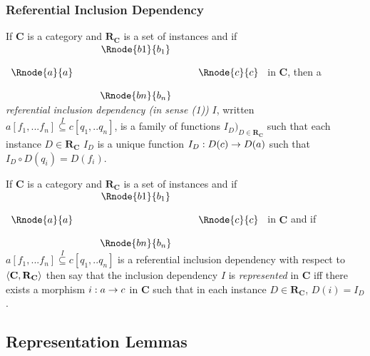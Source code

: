 \documentclass[10pt,a4paper]{article}
\theoremstyle{remark}
\newcommand{\catc}[1][C]{\textbf{#1}}
\newcommand{\reqt}{\textbf{R}}
\newcommand{\reqtc}[1][\catc]{\reqt_{#1}}
\newcommand{\term}[1]{\textit{#1}}  %
\begin{document}
\subsubsection{Referential Inclusion Dependency}
\begin{definition}
If $\catc$ is a category and $\reqtc$ is a set of instances and if
$
\begin{array}{c p{0.25cm} c  p{0.25cm} c }
             &&   \Rnode{b1}{b_1} &&              \\[0.4cm]
\Rnode{a}{a} &&                   && \Rnode{c}{c} \\[0.4cm]
             &&   \Rnode{bn}{b_n} &&              
\end{array} 
$
in $\catc$, then a \term{referential inclusion dependency (in sense (1))} $I$, written $a[f_1,...f_n] \overset{I}{\subseteq} c[q_1,..q_n]$, is a family of functions $I_D)_{D \in \reqtc}$
such that each instance $D \in \reqtc$ $I_D$ is a unique function $I_D : D(c) \rightarrow D(a)$ such that
$I_D \circ D(q_i) = D(f_i)$.
\end{definition}

\begin{definition}
If $\catc$ is a category and $\reqtc$ is a set of instances and if
$
\begin{array}{c p{0.25cm} c  p{0.25cm} c }
             &&   \Rnode{b1}{b_1} &&              \\[0.4cm]
\Rnode{a}{a} &&                   && \Rnode{c}{c} \\[0.4cm]
             &&   \Rnode{bn}{b_n} &&              
\end{array} 
$
in $\catc$ and if $a[f_1,...f_n] \overset{I}{\subseteq} c[q_1,..q_n]$ is a referential inclusion dependency
with respect  to $\tuple{\catc,\reqtc}$ then say that the inclusion dependency $I$ is \term{represented} in $\catc$
iff there exists a morphism $i:a \rightarrow c$ in $\catc$ such that in each instance $D \in \reqtc$, $D(i) = I_D$. 
\end{definition}

\subsection{Representation Lemmas}
\end{document}

